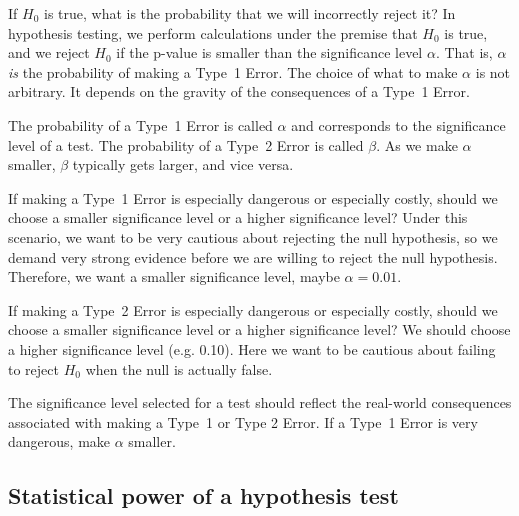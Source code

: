 
If $H_0$ is true, what is the probability that we will incorrectly reject it? In hypothesis testing, we perform calculations under the premise that $H_0$ is true, and we reject $H_0$ if the p-value is smaller than the significance level $\alpha$. That is, $\alpha$ \emph{is} the probability of making a Type~1 Error. The choice of what to make $\alpha$ is not arbitrary. It depends on the gravity of the consequences of a Type~1 Error.

\begin{termBox}{
The probability of a Type~1 Error is called $\alpha$ and corresponds to the significance level of a test. The probability of a Type~2 Error is called $\beta$. As we make $\alpha$ smaller, $\beta$ typically gets larger, and vice versa.}
\end{termBox}

\begin{example}{If making a Type~1 Error is especially dangerous or especially costly, should we choose a smaller significance level or a higher significance level?}
Under this scenario, we want to be very cautious about rejecting the null hypothesis, so we demand very strong evidence before we are willing to reject the null hypothesis. Therefore, we want a smaller significance level, maybe $\alpha = 0.01$.
\end{example}

\begin{example}{If making a Type~2 Error is especially dangerous or especially costly, should we choose a smaller significance level or a higher significance level?}
We should choose a higher significance level (e.g. 0.10). Here we want to be cautious about failing to reject $H_0$ when the null is actually false.
\end{example}

\begin{tipBox}{
The significance level selected for a test should reflect the real-world consequences associated with making a Type~1 or Type 2 Error. If a Type~1 Error is very dangerous, make $\alpha$ smaller.}
\end{tipBox}



\subsection{Statistical power of a hypothesis test}

